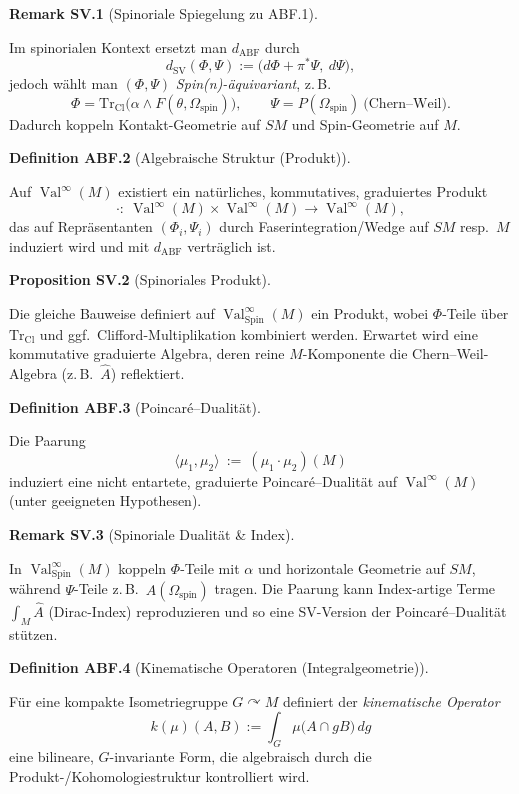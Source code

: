 \documentclass[10pt, letterpaper]{article}
\newcommand{\Spin}{\mathrm{Spin}}
\newcommand{\CustomHeading}[3]{%
  \par\medskip\noindent%
  \textbf{#1 #2} \textnormal{(#3)}.\enskip%
}
\newenvironment{DEF}[2]{\begin{unitbox}\CustomHeading{Definition}{#1}{#2}}{\end{unitbox}}
\newenvironment{PROP}[2]{\begin{unitbox}\CustomHeading{Proposition}{#1}{#2}}{\end{unitbox}}
\newenvironment{REM}[2]{\begin{unitbox}\CustomHeading{Remark}{#1}{#2}}{\end{unitbox}}
\begin{document}
\begin{REM}{SV.1}{Spinoriale Spiegelung zu ABF.1}
Im spinorialen Kontext ersetzt man $d_{\mathrm{ABF}}$ durch
\[
d_{\mathrm{SV}}(\Phi,\Psi):=\big(d\Phi+\pi^*\Psi,\ d\Psi\big),
\]
jedoch wählt man $(\Phi,\Psi)$ \emph{Spin(n)-äquivariant}, z.\,B.
\[
\Phi=\mathrm{Tr}_{\mathrm{Cl}}\!\big(\alpha\wedge F(\theta,\Omega_{\mathrm{spin}})\big),\qquad
\Psi=P(\Omega_{\mathrm{spin}})\ \text{(Chern--Weil)}.
\]
Dadurch koppeln Kontakt-Geometrie auf $SM$ und Spin-Geometrie auf $M$.
\end{REM}


\begin{DEF}{ABF.2}{Algebraische Struktur (Produkt)}
Auf $\operatorname{Val}^\infty(M)$ existiert ein natürliches, kommutatives, graduiertes Produkt
\[
\cdot:\ \operatorname{Val}^\infty(M)\times\operatorname{Val}^\infty(M)\longrightarrow \operatorname{Val}^\infty(M),
\]
das auf Repräsentanten $(\Phi_i,\Psi_i)$ durch Faserintegration/Wedge auf $SM$ resp.\ $M$ induziert wird und mit $d_{\mathrm{ABF}}$ verträglich ist.
\end{DEF}

\begin{PROP}{SV.2}{Spinoriales Produkt}
Die gleiche Bauweise definiert auf $\operatorname{Val}^\infty_{\Spin}(M)$ ein Produkt, wobei $\Phi$-Teile über
$\mathrm{Tr}_{\mathrm{Cl}}$ und ggf.\ Clifford-Multiplikation kombiniert werden.
Erwartet wird eine kommutative graduierte Algebra, deren reine $M$-Komponente
die Chern--Weil-Algebra (z.\,B.\ $\widehat A$) reflektiert.
\end{PROP}


\begin{DEF}{ABF.3}{Poincaré–Dualität}
Die Paarung
\[
\langle \mu_1,\mu_2\rangle \ :=\ (\mu_1\cdot\mu_2)(M)
\]
induziert eine nicht entartete, graduierte Poincaré–Dualität auf $\operatorname{Val}^\infty(M)$ (unter geeigneten Hypothesen).
\end{DEF}

\begin{REM}{SV.3}{Spinoriale Dualität \& Index}
In $\operatorname{Val}^\infty_{\Spin}(M)$ koppeln $\Phi$-Teile mit $\alpha$ und horizontale Geometrie auf $SM$, während $\Psi$-Teile z.\,B.\ $\widehat A(\Omega_{\mathrm{spin}})$ tragen. Die Paarung kann Index-artige Terme $\int_M\widehat A$ (Dirac-Index) reproduzieren und so eine SV-Version der Poincaré–Dualität stützen.
\end{REM}


\begin{DEF}{ABF.4}{Kinematische Operatoren (Integralgeometrie)}
Für eine kompakte Isometriegruppe $G\curvearrowright M$ definiert der \emph{kinematische Operator}
\[
k(\mu)(A,B):=\int_G \mu\big(A\cap gB\big)\,dg
\]
eine bilineare, $G$-invariante Form, die algebraisch durch die Produkt-/Kohomologiestruktur kontrolliert wird.
\end{DEF}
\end{document}
